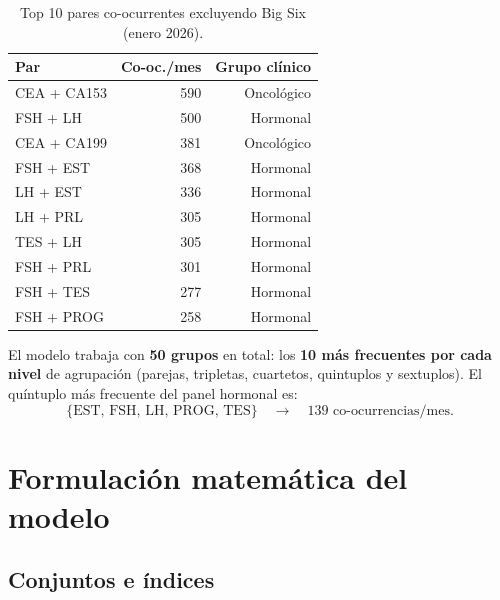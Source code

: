 \documentclass[12pt, a4paper]{article}
\begin{document}
\begin{table}[H]
\centering
\caption{Top 10 pares co-ocurrentes excluyendo Big Six (enero 2026).}
\begin{tabular}{lrr}
\toprule
\textbf{Par} & \textbf{Co-oc./mes} & \textbf{Grupo clínico} \\
\midrule
CEA + CA153  & 590 & Oncológico \\
FSH + LH     & 500 & Hormonal   \\
CEA + CA199  & 381 & Oncológico \\
FSH + EST    & 368 & Hormonal   \\
LH + EST     & 336 & Hormonal   \\
LH + PRL     & 305 & Hormonal   \\
TES + LH     & 305 & Hormonal   \\
FSH + PRL    & 301 & Hormonal   \\
FSH + TES    & 277 & Hormonal   \\
FSH + PROG   & 258 & Hormonal   \\
\bottomrule
\end{tabular}
\end{table}

El modelo trabaja con \textbf{50 grupos} en total: los \textbf{10 más frecuentes por cada
nivel} de agrupación (parejas, tripletas, cuartetos, quintuplos y sextuplos). El quíntuplo
más frecuente del panel hormonal es:
\[
  \{\text{EST},\,\text{FSH},\,\text{LH},\,\text{PROG},\,\text{TES}\}
  \quad\longrightarrow\quad 139\text{ co-ocurrencias/mes.}
\]

\clearpage
\section{Formulación matemática del modelo}

\subsection{Conjuntos e índices}
\end{document}
